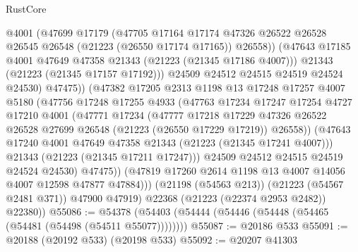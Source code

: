 \begin{lexlean}{RustCore}
\begin{coremodule}
                        @4001
                        (@47699
                          @17179
                          (@47705
                            @17164
                            @17174
                            @47326
                            @26522
                            @26528
                            @26545
                            @26548
                            (@21223 (@26550 @17174 @17165))
                            @26558))
                        (@47643 @17185 @4001 @47649 @47358 @21343 (@21223 (@21345 @17186 @4007)))
                        @21343
                        (@21223 (@21345 @17157 @17192)))
                      @24509
                      @24512
                      @24515
                      @24519
                      @24524
                      @24530)
                    @47475))
                (@47382
                  @17205
                  @2313
                  @1198
                  @13
                  @17248
                  @17257
                  @4007
                  @5180
                  (@47756
                    @17248
                    @17255
                    @4933
                    (@47763
                      @17234
                      @17247
                      @17254
                      @4727
                      @17210
                      @4001
                      (@47771
                        @17234
                        (@47777
                          @17218
                          @17229
                          @47326
                          @26522
                          @26528
                          @27699
                          @26548
                          (@21223 (@26550 @17229 @17219))
                          @26558))
                      (@47643 @17240 @4001 @47649 @47358 @21343 (@21223 (@21345 @17241 @4007)))
                      @21343
                      (@21223 (@21345 @17211 @17247)))
                    @24509
                    @24512
                    @24515
                    @24519
                    @24524
                    @24530)
                  @47475))
              (@47819 @17260 @2614 @1198 @13 @4007 @14056 @4007 @12598 @47877 @47884)))
          (@21198 (@54563 @213))
          (@21223 (@54567 @2481 @371))
          @47900
          @47919)
        @22368
        (@21223 (@22374 @2953 @2482))
        @22380))
@55086 := @54378 (@54403 (@54444 (@54446 (@54448 (@54465 (@54481 (@54498 (@54511 @55077))))))))
@55087 := @20186 @533
@55091 := @20188 (@20192 @533) (@20198 @533)
@55092 := @20207 @41303

\end{coremodule}
\end{lexlean}
